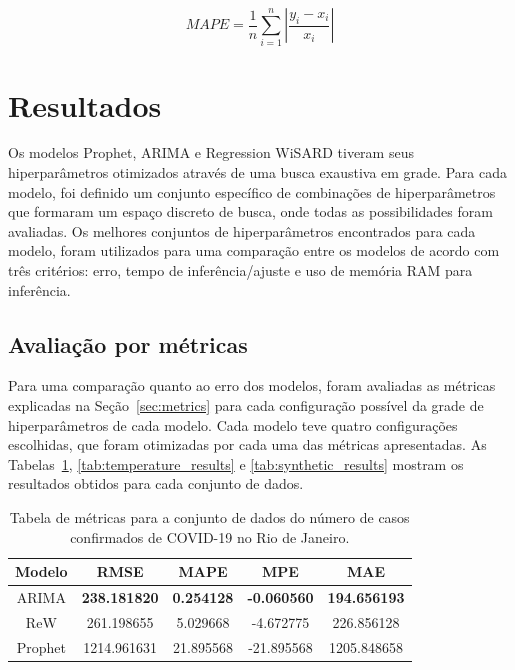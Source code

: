 \begin{equation} \label{eq:mape}
    MAPE=\dfrac{1}{n}\sum ^{n}_{i=1}\left| \dfrac{y_{i}-x_{i}}{x_{i}}\right|
\end{equation}

\section{Resultados}
Os modelos Prophet, ARIMA e Regression WiSARD tiveram seus hiperparâmetros otimizados através de uma busca exaustiva em grade. Para cada modelo, foi definido um conjunto específico de combinações de hiperparâmetros que formaram um espaço discreto de busca, onde todas as possibilidades foram avaliadas. Os melhores conjuntos de hiperparâmetros encontrados para cada modelo, foram utilizados para uma comparação entre os modelos de acordo com três critérios: erro, tempo de inferência/ajuste e uso de memória RAM para inferência.

\subsection{Avaliação por métricas}\label{subsec:metrics_eval}
Para uma comparação quanto ao erro dos modelos, foram avaliadas as métricas explicadas na Seção~\ref{sec:metrics} para cada configuração possível da grade de hiperparâmetros de cada modelo. Cada modelo teve quatro configurações escolhidas, que foram otimizadas por cada uma das métricas apresentadas. As Tabelas~\ref{tab:covid_results}, \ref{tab:temperature_results} e \ref{tab:synthetic_results} mostram os resultados obtidos para cada conjunto de dados.


\begin{table}[!htp]
    \caption{Tabela de métricas para a conjunto de dados do número de casos confirmados de COVID-19 no Rio de Janeiro.}\label{tab:covid_results}
    \centering
    \begin{tabular}{@{}ccccc@{}} \toprule
        Modelo  & RMSE                & MAPE              & MPE                & MAE                 \\ \midrule
        ARIMA   & \textbf{238.181820} & \textbf{0.254128} & \textbf{-0.060560} & \textbf{194.656193} \\
        ReW     & 261.198655          & 5.029668          & -4.672775          & 226.856128          \\
        Prophet & 1214.961631         & 21.895568         & -21.895568         & 1205.848658         \\ \bottomrule
    \end{tabular}
\end{table}


